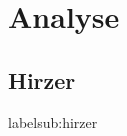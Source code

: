 \section{Analyse} %
\label{sec:analyse}
\begin{comment}
	Detailierte Beschreibung der Algorithmen inkl. O-Notation (Nitty-Gritty Darstellung der Algos)
	1. ARToolKit
	2. ARToolKitPlus
	3. Zissermann/Clarke
	Analyse: Die auswertung nach den Kriterein aus Kap. Vorgehen OHNE WERTUNG! Nur die Daten erheben und auswerten.
\end{comment}

\subsection{Hirzer} %
label{sub:hirzer}







